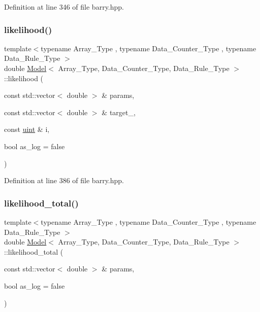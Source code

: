 Definition at line 346 of file barry.\+hpp.

\mbox{\label{classbarry_1_1_model_ab88f541fc010f0ee1a415c9cb6c292b7}} 
\subsubsection{\texorpdfstring{likelihood()}{likelihood()}\hspace{0.1cm}{\footnotesize\ttfamily [3/3]}}
{\footnotesize\ttfamily template$<$typename Array\+\_\+\+Type , typename Data\+\_\+\+Counter\+\_\+\+Type , typename Data\+\_\+\+Rule\+\_\+\+Type $>$ \\
double \hyperlink{classbarry_1_1_model}{Model}$<$ Array\+\_\+\+Type, Data\+\_\+\+Counter\+\_\+\+Type, Data\+\_\+\+Rule\+\_\+\+Type $>$\+::likelihood (\begin{DoxyParamCaption}\item[{const std\+::vector$<$ double $>$ \&}]{params,  }\item[{const std\+::vector$<$ double $>$ \&}]{target\+\_\+,  }\item[{const \hyperlink{namespacebarry_a11dfc53ddb4672278319aa04f1e09a6c}{uint} \&}]{i,  }\item[{bool}]{as\+\_\+log = {\ttfamily false} }\end{DoxyParamCaption})\hspace{0.3cm}{\ttfamily [inline]}}



Definition at line 386 of file barry.\+hpp.

\mbox{\label{classbarry_1_1_model_a31d16ef478d772cedde0813575074a0f}} 
\subsubsection{\texorpdfstring{likelihood\+\_\+total()}{likelihood\_total()}}
{\footnotesize\ttfamily template$<$typename Array\+\_\+\+Type , typename Data\+\_\+\+Counter\+\_\+\+Type , typename Data\+\_\+\+Rule\+\_\+\+Type $>$ \\
double \hyperlink{classbarry_1_1_model}{Model}$<$ Array\+\_\+\+Type, Data\+\_\+\+Counter\+\_\+\+Type, Data\+\_\+\+Rule\+\_\+\+Type $>$\+::likelihood\+\_\+total (\begin{DoxyParamCaption}\item[{const std\+::vector$<$ double $>$ \&}]{params,  }\item[{bool}]{as\+\_\+log = {\ttfamily false} }\end{DoxyParamCaption})\hspace{0.3cm}{\ttfamily [inline]}}



